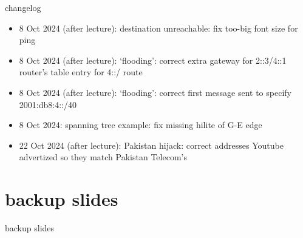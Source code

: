 \date{}
\title{}
\date{}

\begin{frame}
    \titlepage
\end{frame}

{\changelogmode
\begin{frame}{changelog}
\begin{itemize}
\item 8 Oct 2024 (after lecture): destination unreachable: fix too-big font size for ping
\item 8 Oct 2024 (after lecture): `flooding': correct extra gateway for 2::3/4::1 router's table entry for 4::/ route
\item 8 Oct 2024 (after lecture): `flooding': correct first message sent to specify 2001:db8:4::/40
\item 8 Oct 2024: spanning tree example: fix missing hilite of G-E edge
\item 22 Oct 2024 (after lecture): Pakistan hijack: correct addresses Youtube advertized so they match Pakistan Telecom's
\end{itemize}
\end{frame}
}



\section{backup slides}
\begin{frame}{backup slides}
\end{frame}


